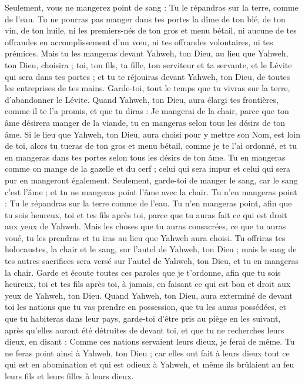 \begin{multicols}{2}
Seulement, vous ne mangerez point de sang : Tu le répandras sur la terre, comme de l'eau.
Tu ne pourras pas manger dans tes portes la dîme de ton blé, de ton vin, de ton huile, ni les premiers-nés de ton gros et menu bétail, ni aucune de tes offrandes en accomplissement d’un vœu, ni tes offrandes volontaires, ni tes prémices.
Mais tu les mangeras devant Yahweh, ton Dieu, au lieu que Yahweh, ton Dieu, choisira ; toi, ton fils, ta fille, ton serviteur et ta servante, et le Lévite qui sera dans tes portes ; et tu te réjouiras devant Yahweh, ton Dieu, de toutes les entreprises de tes mains.
Garde-toi, tout le temps que tu vivras sur la terre, d'abandonner le Lévite.
Quand Yahweh, ton Dieu, aura élargi tes frontières, comme il te l’a promis, et que tu diras : Je mangerai de la chair, parce que ton âme désirera manger de la viande, tu en mangeras selon tous les désirs de ton âme.
Si le lieu que Yahweh, ton Dieu, aura choisi pour y mettre son Nom, est loin de toi, alors tu tueras de ton gros et menu bétail, comme je te l'ai ordonné, et tu en mangeras dans tes portes selon tous les désirs de ton âme.
Tu en mangeras comme on mange de la gazelle et du cerf ; celui qui sera impur et celui qui sera pur en mangeront également.
Seulement, garde-toi de manger le sang, car le sang c’est l'âme ; et tu ne mangeras point l'âme avec la chair.
Tu n'en mangeras point : Tu le répandras sur la terre comme de l'eau.
Tu n'en mangeras point, afin que tu sois heureux, toi et tes fils après toi, parce que tu auras fait ce qui est droit aux yeux de Yahweh.
Mais les choses que tu auras consacrées, ce que tu auras voué, tu les prendras et tu iras au lieu que Yahweh aura choisi.
Tu offriras tes holocaustes, la chair et le sang, sur l'autel de Yahweh, ton Dieu ; mais le sang de tes autres sacrifices sera versé sur l'autel de Yahweh, ton Dieu, et tu en mangeras la chair.
Garde et écoute toutes ces paroles que je t’ordonne, afin que tu sois heureux, toi et tes fils après toi, à jamais, en faisant ce qui est bon et droit aux yeux de Yahweh, ton Dieu.
Quand Yahweh, ton Dieu, aura exterminé de devant toi les nations que tu vas prendre en possession, que tu les auras possédées, et que tu habiteras dans leur pays,
garde-toi d’être pris au piège en les suivant, après qu’elles auront été détruites de devant toi, et que tu ne recherches leurs dieux, en disant : Comme ces nations servaient leurs dieux, je ferai de même.
Tu ne feras point ainsi à Yahweh, ton Dieu ; car elles ont fait à leurs dieux tout ce qui est en abomination et qui est odieux à Yahweh, et même ils brûlaient au feu leurs fils et leurs filles à leurs dieux.

\end{multicols}
